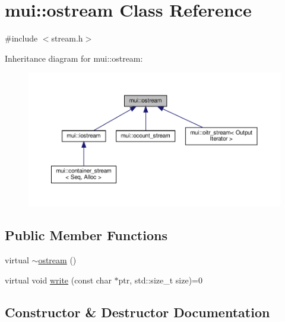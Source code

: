 \hypertarget{classmui_1_1ostream}{}\section{mui\+:\+:ostream Class Reference}
\label{classmui_1_1ostream}


{\ttfamily \#include $<$stream.\+h$>$}



Inheritance diagram for mui\+:\+:ostream\+:
\nopagebreak
\begin{figure}[H]
\begin{center}
\leavevmode
\includegraphics[width=350pt]{classmui_1_1ostream__inherit__graph}
\end{center}
\end{figure}
\subsection*{Public Member Functions}
\begin{DoxyCompactItemize}
\item 
virtual \hyperlink{classmui_1_1ostream_ab9c85b4e3cd989ab83bc2935e82da5ab}{$\sim$ostream} ()
\item 
virtual void \hyperlink{classmui_1_1ostream_a93a0a1d32007efc375d885181c833995}{write} (const char $\ast$ptr, std\+::size\+\_\+t size)=0
\end{DoxyCompactItemize}


\subsection{Constructor \& Destructor Documentation}
\mbox{\label{classmui_1_1ostream_ab9c85b4e3cd989ab83bc2935e82da5ab}} 
